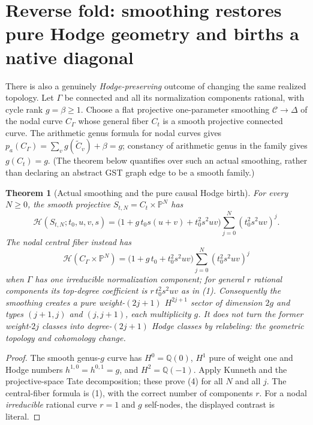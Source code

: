 \documentclass[11pt]{article}
\newtheorem{theorem}{Theorem}
\begin{document}
\section{Reverse fold: smoothing restores pure Hodge geometry and births a native diagonal}
There is also a genuinely \emph{Hodge-preserving} outcome of
changing the same realized topology.  Let $\Gamma$ be connected and
all its normalization components rational, with cycle rank
$g=\beta\geq1$. Choose a flat projective one-parameter smoothing
$\mathscr C\to\Delta$ of the nodal curve $C_\Gamma$ whose general
fiber $C_t$ is a smooth projective connected curve.
The arithmetic genus formula for nodal curves gives
$p_a(C_\Gamma)=\sum_v g(\widetilde C_v)+\beta=g$; constancy
of arithmetic genus in the family gives $g(C_t)=g$.
(The theorem below quantifies over such an actual smoothing, rather
than declaring an abstract GST graph edge to be a smooth family.)

\begin{theorem}[Actual smoothing and the pure causal Hodge birth]
For every $N\geq0$, the smooth projective
$S_{t,N}=C_t\times\mathbb P^N$ has
\[
\boxed{\quad
\mathcal H(S_{t,N};t_0,u,v,s)=
\bigl(1+g\,t_0s(u+v)+t_0^2s^2uv\bigr)
\sum_{j=0}^{N}(t_0^2s^2uv)^j.
\quad}\tag{4}
\]
The nodal central fiber instead has
\[
\mathcal H(C_\Gamma\times\mathbb P^N)
=\bigl(1+g\,t_0+t_0^2s^2uv\bigr)
\sum_{j=0}^{N}(t_0^2s^2uv)^j
\]
when $\Gamma$ has one irreducible normalization component;
for general $r$ rational components its top-degree coefficient
is $r\,t_0^2s^2uv$ as in (1).
Consequently the smoothing creates a pure weight-$(2j+1)$
$H^{2j+1}$ sector of dimension $2g$ and types
$(j+1,j)$ and $(j,j+1)$, each multiplicity $g$.
It does \emph{not} turn the former weight-$2j$ classes into
degree-$(2j+1)$ Hodge classes by relabeling:
the geometric topology and cohomology change.
\end{theorem}
\begin{proof}
The smooth genus-$g$ curve has $H^0=\mathbb Q(0)$,
$H^1$ pure of weight one and Hodge numbers
$h^{1,0}=h^{0,1}=g$, and $H^2=\mathbb Q(-1)$.
Apply Kunneth and the projective-space Tate decomposition;
these prove (4) for all $N$ and all $j$.
The central-fiber formula is (1), with the correct number of
components $r$. For a nodal \emph{irreducible} rational curve
$r=1$ and $g$ self-nodes, the displayed contrast is literal.
\end{proof}
\end{document}
